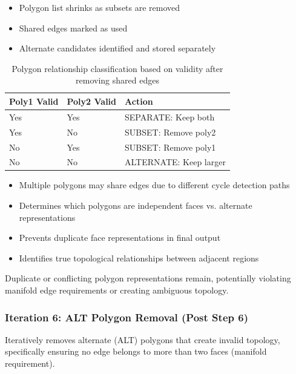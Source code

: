 \begin{itemize}
    \item Polygon list shrinks as subsets are removed
    \item Shared edges marked as used
    \item Alternate candidates identified and stored separately
\end{itemize}

\begin{table}[h]
\centering
\small
\begin{tabular}{@{}lll@{}}
\toprule
\textbf{Poly1 Valid} & \textbf{Poly2 Valid} & \textbf{Action} \\
\midrule
Yes & Yes & SEPARATE: Keep both \\
Yes & No & SUBSET: Remove poly2 \\
No & Yes & SUBSET: Remove poly1 \\
No & No & ALTERNATE: Keep larger \\
\bottomrule
\end{tabular}
\caption{Polygon relationship classification based on validity after removing shared edges}
\end{table}

\begin{itemize}
    \item Multiple polygons may share edges due to different cycle detection paths
    \item Determines which polygons are independent faces vs. alternate representations
    \item Prevents duplicate face representations in final output
    \item Identifies true topological relationships between adjacent regions
\end{itemize}

Duplicate or conflicting polygon representations remain, potentially violating manifold edge requirements or creating ambiguous topology.

\subsubsection{Iteration 6: ALT Polygon Removal (Post Step 6)}

Iteratively removes alternate (ALT) polygons that create invalid topology, specifically ensuring no edge belongs to more than two faces (manifold requirement).

